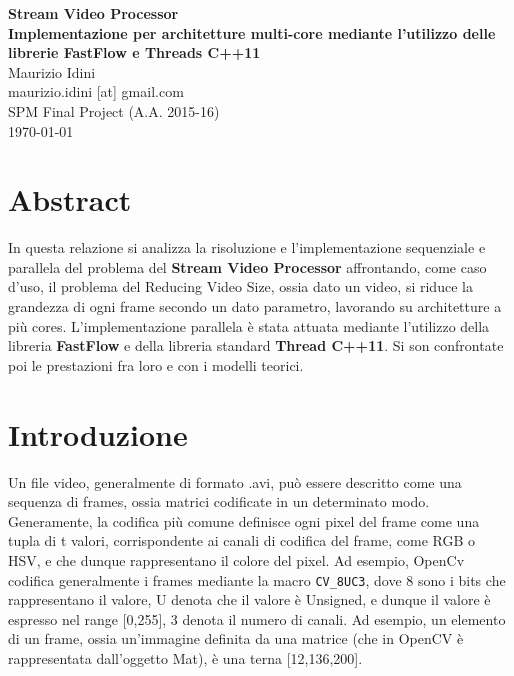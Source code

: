 \documentclass[12pt]{article}
\begin{document}
\renewcommand{\figurename}{Fig.}
\begin{center}
\LARGE\textbf{Stream Video Processor\\Implementazione per architetture multi-core mediante l'utilizzo delle librerie FastFlow e Threads C++11}\\
\vspace{0.2in}
\center
\normalsize{Maurizio Idini}\\
\normalsize{maurizio.idini [at] gmail.com}\\
\normalsize{SPM Final Project (A.A. 2015-16)} \\
\normalsize{\today}\\
\end{center}

\section*{Abstract}
In questa relazione si analizza la risoluzione e l'implementazione sequenziale e parallela del problema del \textbf{Stream Video Processor} affrontando, come caso d'uso, il problema del Reducing Video Size, ossia dato un video, si riduce la grandezza di ogni frame secondo un dato parametro, lavorando su architetture a pi\`u cores. L'implementazione parallela \`e stata attuata mediante l'utilizzo della libreria \textbf{FastFlow} e della libreria standard \textbf{Thread C++11}. Si son confrontate poi le prestazioni fra loro e con i modelli teorici.

\section{Introduzione}
Un file video, generalmente di formato .avi, pu\`o essere descritto come una sequenza di frames, ossia matrici codificate in un determinato modo. Generamente, la codifica pi\`u comune definisce ogni pixel del frame come una tupla di t valori, corrispondente ai canali di codifica del frame, come RGB o HSV, e che dunque rappresentano il colore del pixel. Ad esempio, OpenCv codifica generalmente i frames mediante la macro \texttt{CV\_8UC3}, dove 8 sono i bits che rappresentano il valore, U denota che il valore \`e Unsigned, e dunque il valore \`e espresso nel range [0,255], 3 denota il numero di canali. Ad esempio, un elemento di un frame, ossia un'immagine definita da una matrice (che in OpenCV \`e rappresentata dall'oggetto Mat),  \`e una terna [12,136,200].
\end{document}
